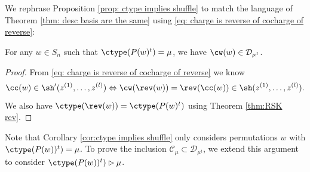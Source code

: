 We rephrase Proposition \ref{prop: ctype implies shuffle} to match the language of Theorem \ref{thm: desc basis are the same} using \eqref{eq: charge is reverse of cocharge of reverse}:

\begin{coro}\label{cor:ctype implies shuffle}
    For any $w\in S_n$ such that $\ctype(P(w)^t) =\mu$, we have $\cw(w)\in \mathcal{D}_{\mu^t}$.
\end{coro}
\begin{proof}
    From  \eqref{eq: charge is reverse of cocharge of reverse} we know  \[\cc(w) \in \sh'(z^{(1)},\dots , z^{(l)}) \Leftrightarrow\cw(\rev(w))= \rev(\cc(w)) \in \sh(z^{(1)},\dots , z^{(l)}).\]
    We also have $\ctype(\rev(w)) = \ctype(P(w)^t)$ using Theorem \ref{thm:RSK rev}.
\end{proof}

Note that Corollary \ref{cor:ctype implies shuffle} only considers permutations $w$ with $\ctype(P(w))^t) = \mu$. To prove the inclusion $\mathcal{C}_\mu \subset \mathcal{D}_{\mu^t}$, we extend this argument to consider $\ctype(P(w))^t) \rhd  \mu$.

